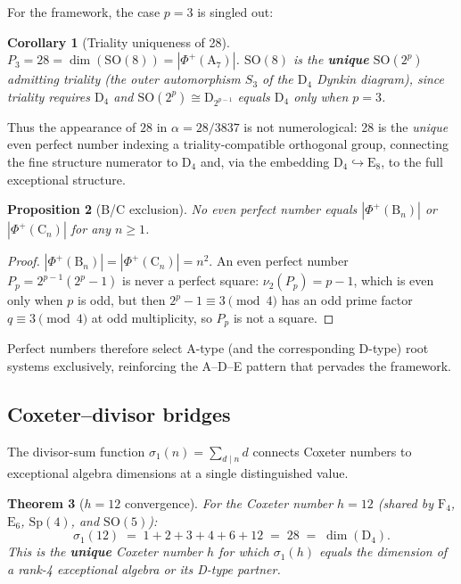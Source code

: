 \documentclass[aps,prd,twocolumn,superscriptaddress,floatfix,nofootinbib]{revtex4-2}
\newtheorem{theorem}{Theorem}
\newtheorem{corollary}[theorem]{Corollary}
\newtheorem{proposition}[theorem]{Proposition}
\theoremstyle{definition}
\theoremstyle{remark}
\begin{document}
For the framework, the case $p=3$ is singled out:

\begin{corollary}[Triality uniqueness of 28]
\label{cor:triality-28}
$P_3 = 28 = \dim(\mathrm{SO}(8)) = |\Phi^+(\mathrm{A}_7)|$.
$\mathrm{SO}(8)$ is the \textbf{unique} $\mathrm{SO}(2^p)$ admitting
triality (the outer automorphism $S_3$ of the $\mathrm{D}_4$ Dynkin
diagram), since triality requires $\mathrm{D}_4$ and
$\mathrm{SO}(2^p) \cong \mathrm{D}_{2^{p-1}}$ equals $\mathrm{D}_4$
only when $p = 3$.
\end{corollary}

\noindent
Thus the appearance of $28$ in $\alpha = 28/3837$ is not numerological:
28 is the \emph{unique} even perfect number indexing a triality-compatible
orthogonal group, connecting the fine structure numerator to $\mathrm{D}_4$
and, via the embedding $\mathrm{D}_4 \hookrightarrow \mathrm{E}_8$,
to the full exceptional structure.

\begin{proposition}[B/C exclusion]
\label{prop:bc-exclusion}
No even perfect number equals $|\Phi^+(\mathrm{B}_n)|$ or
$|\Phi^+(\mathrm{C}_n)|$ for any $n \geq 1$.
\end{proposition}

\begin{proof}
$|\Phi^+(\mathrm{B}_n)| = |\Phi^+(\mathrm{C}_n)| = n^2$.
An even perfect number $P_p = 2^{p-1}(2^p-1)$ is never a perfect
square: $\nu_2(P_p) = p-1$, which is even only when $p$ is odd,
but then $2^p - 1 \equiv 3 \pmod{4}$ has an odd prime factor
$q \equiv 3 \pmod{4}$ at odd multiplicity, so $P_p$ is not a square.
\end{proof}

\noindent
Perfect numbers therefore select A-type (and the corresponding D-type)
root systems exclusively, reinforcing the A--D--E pattern that pervades
the framework.

\subsection{Coxeter--divisor bridges}
\label{sec:coxeter-divisor-bridges}

The divisor-sum function $\sigma_1(n) = \sum_{d \mid n} d$ connects
Coxeter numbers to exceptional algebra dimensions at a single
distinguished value.

\begin{theorem}[$h{=}12$ convergence]
\label{thm:h12-convergence}
For the Coxeter number $h = 12$ (shared by $\mathrm{F}_4$,
$\mathrm{E}_6$, $\mathrm{Sp}(4)$, and $\mathrm{SO}(5)$):
\begin{equation}
\sigma_1(12) \;=\; 1+2+3+4+6+12 \;=\; 28 \;=\; \dim(\mathrm{D}_4).
\end{equation}
This is the \textbf{unique} Coxeter number $h$ for which $\sigma_1(h)$
equals the dimension of a rank-4 exceptional algebra or its D-type partner.
\end{theorem}
\end{document}
